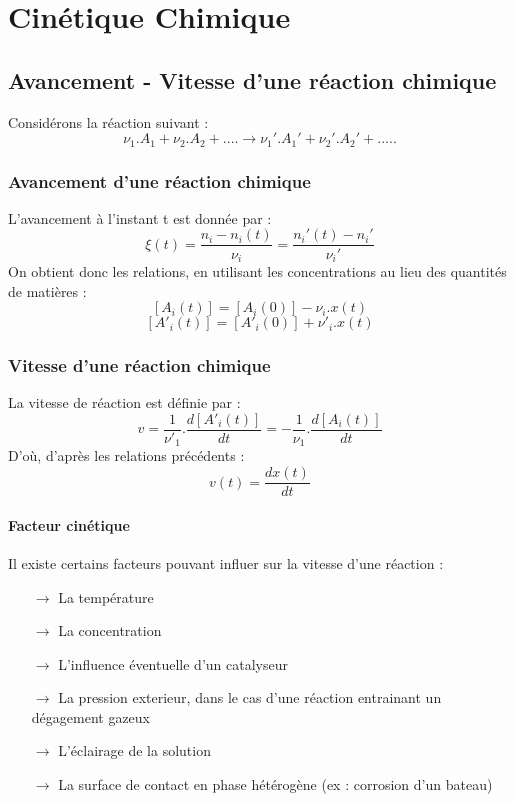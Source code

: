 \chapter{Cinétique Chimique}
\section{Avancement - Vitesse d'une réaction chimique}
Considérons la réaction suivant :
$$\nu_1.A_1 + \nu_2.A_2 + .... \rightarrow \nu_1'.A_1' + \nu_2'.A_2' + .....$$
\subsection{Avancement d'une réaction chimique}
\begin{de}
L'avancement à l'instant t est donnée par :
$$\xi(t) = \dfrac{n_i - n_i(t)}{\nu_i} = \dfrac{n_i'(t) - n_i'}{\nu_i'} $$
On obtient donc les relations, en utilisant les concentrations au lieu des quantités de matières :
$$[A_i(t)] = [A_i(0)] - \nu_i.x(t)$$
$$[A'_i(t)] = [A'_i(0)] + \nu'_i.x(t)$$
\end{de}
\subsection{Vitesse d'une réaction chimique}
\begin{de} 
La vitesse de réaction est définie par :
$$v = \dfrac{1}{\nu'_1}.\dfrac{d[A'_i(t)]}{dt} = -\dfrac{1}{\nu_1}.\dfrac{d[A_i(t)]}{dt}$$
D'où, d'après les relations précédents :
$$v(t) = \dfrac{dx(t)}{dt}$$
\end{de}
\subsubsection{Facteur cinétique}
Il existe certains facteurs pouvant influer sur la vitesse d'une réaction :
\begin{itemize}
 \item[$\rightarrow$] La température
 \item[$\rightarrow$] La concentration
 \item[$\rightarrow$] L'influence éventuelle d'un catalyseur
 \item[$\rightarrow$] La pression exterieur, dans le cas d'une réaction entrainant un dégagement gazeux
 \item[$\rightarrow$] L'éclairage de la solution
 \item[$\rightarrow$] La surface de contact en phase hétérogène (ex : corrosion d'un bateau)
\end{itemize}
